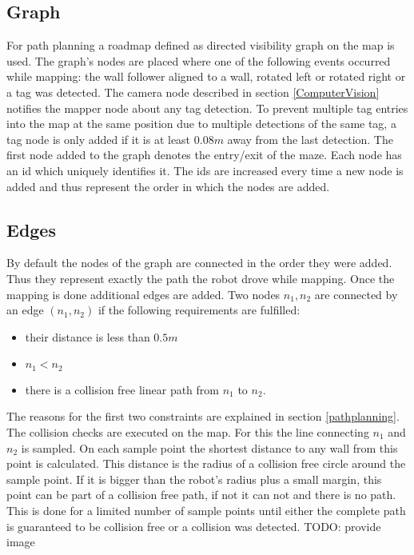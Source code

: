 \subsection{Graph}

For path planning a roadmap defined as directed visibility graph on the map is used. The graph's nodes are placed where one of the following events occurred while mapping: the wall follower aligned to a wall, rotated left or rotated right or a tag was detected. 
The camera node described in section \ref{ComputerVision} notifies the mapper node about any tag detection. To prevent multiple tag entries into the map at the same position due to multiple detections of the same tag, a tag node is only added if it is at least $0.08m$ away from the last detection. 
The first node added to the graph denotes the entry/exit of the maze.
Each node has an id which uniquely identifies it. The ids are increased every time a new node is added and thus represent the order in which the nodes are added.

\subsection{Edges}

By default the nodes of the graph are connected in the order they were added. Thus they represent exactly the path the robot drove while mapping. Once the mapping is done additional edges are added. Two nodes $n_1,n_2$ are connected by an edge $(n_1,n_2)$ if the following requirements are fulfilled:
\begin{itemize}
 \item their distance is less than $0.5m$
 \item $n_1 < n_2$
 \item there is a collision free linear path from $n_1$ to $n_2$.
\end{itemize}

The reasons for the first two constraints are explained in section \ref{pathplanning}. The collision checks are executed on the map. For this the line connecting $n_1$ and $n_2$ is sampled. On each sample point the shortest distance to any wall from this point is calculated. This distance is the radius of a collision free circle around the sample point. If it is bigger than the robot's radius plus a small margin, this point can be part of a collision free path, if not it can not and there is no path. This is done for a limited number of sample points until either the complete path is guaranteed to be collision free or a collision was detected.
TODO: provide image

